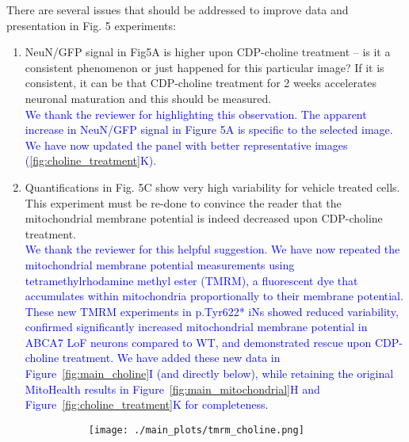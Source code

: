 There are several issues that should be addressed to improve data and presentation in Fig. 5 experiments:
\begin{enumerate}
	\item NeuN/GFP signal in Fig5A is higher upon CDP-choline treatment – is it a consistent phenomenon or just happened for this particular image? If it is consistent, it can be that CDP-choline treatment for 2 weeks accelerates neuronal maturation and this should be measured.\\
	\textcolor{blue}{We thank the reviewer for highlighting this observation. The apparent increase in NeuN/GFP signal in Figure 5A is specific to the selected image. We have now updated the panel with better representative images (\ref{fig:choline_treatment}K).}

	\item Quantifications in Fig. 5C show very high variability for vehicle treated cells. This experiment must be re-done to convince the reader that the mitochondrial membrane potential is indeed decreased upon CDP-choline treatment.\\
	\textcolor{blue}{We thank the reviewer for this helpful suggestion. We have now repeated the mitochondrial membrane potential measurements using tetramethylrhodamine methyl ester (TMRM), a fluorescent dye that accumulates within mitochondria proportionally to their membrane potential. These new TMRM experiments in p.Tyr622* iNs showed reduced variability, confirmed significantly increased mitochondrial membrane potential in ABCA7 LoF neurons compared to WT, and demonstrated rescue upon CDP-choline treatment. We have added these new data in Figure~\ref{fig:main_choline}I (and directly below), while retaining the original MitoHealth results in Figure~\ref{fig:main_mitochondrial}H and Figure~\ref{fig:choline_treatment}K for completeness.}

	\begin{figure}[H]
		\centering
		\begin{subfigure}[t]{.6\textwidth}
			\vspace{-0.15cm}
			\texttt{[image: ./main\_plots/tmrm\_choline.png]}        
		\end{subfigure} 
	\end{figure}


\end{enumerate}
